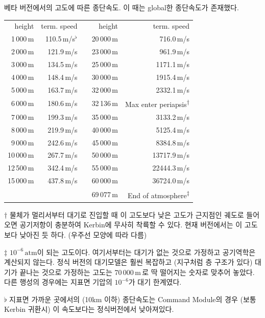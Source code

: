 \documentclass[9pt]{amsbook}
\newcommand{\ttuna}{\textsuperscript{$\dagger$}} %
\newcommand{\ttsecu}{\textsuperscript{$\ddagger$}} %
\begin{document}
\begin{center}
\begin{threeparttable}
	\caption{베타 버전에서의 고도에 따른 종단속도. 이 때는 global한 종단속도가 존재했다.}
		\begin{tabular}{|r|r|r|r|r|}
			\cline{1-2}\cline{4-5}
			height& term. speed&&height& term. speed
			\\\cline{1-2}\cline{4-5}
			1\,000\,m&110.5\,m/s$^\flat$ && 20\,000\,m&716.0\,m/s
			\\\cline{1-2}\cline{4-5}
			2\,000\,m&121.9\,m/s && 23\,000\,{m}&961.9\,m/s
			\\\cline{1-2}\cline{4-5}
			3\,000\,m&134.5\,m/s && 25\,000\,{m}&1171.1\,m/s
			\\\cline{1-2}\cline{4-5}
			4\,000\,m&148.4\,m/s && 30\,000\,{m}&1915.4\,m/s
			\\\cline{1-2}\cline{4-5}
			5\,000\,m&163.7\,m/s && 32\,000\,{m}&2332.1\,m/s
			\\\cline{1-2}\cline{4-5}
			6\,000\,{m}&180.6\,m/s && 32\,136\,{m}&Max enter periapsis\ttuna
			\\\cline{1-2}\cline{4-5}
			7\,000\,{m}&199.3\,m/s && 35\,000\,{m}&3133.2\,m/s
			\\\cline{1-2}\cline{4-5}
			8\,000\,{m}&219.9\,m/s && 40\,000\,{m}&5125.4\,m/s
			\\\cline{1-2}\cline{4-5}
			9\,000\,{m}&242.6\,m/s && 45\,000\,{m}&8384.8\,m/s
			\\\cline{1-2}\cline{4-5}
			10\,000\,{m}&267.7\,m/s && 50\,000\,{m}&13717.9\,m/s
			\\\cline{1-2}\cline{4-5}
			12\,500\,{m}&342.4\,m/s && 55\,000\,{m}&22444.3\,m/s
			\\\cline{1-2}\cline{4-5}
			15\,000\,{m}&437.8\,m/s && 60\,000\,{m}&36724.0\,m/s
			\\\cline{1-2}\cline{4-5}
			\multicolumn{3}{r|}{}&69\,077\,{m}&End of atmosphere\ttsecu
			\\\cline{4-5}
		\end{tabular}
	\begin{tablenotes}
		\item [$\dagger$] 물체가 멀리서부터 대기로 진입할 때 이 고도보다 낮은 고도가 근지점인 궤도로 들어오면
						 공기저항이 충분하여 Kerbin에 무사히 착륙할 수 있다.
						 현재 버전에서는 이 고도보다 낮아진 듯 하다. (우주선 모양에 따라 다름)
		\item[$\ddagger$] $10^{-6}\,\mathrm{atm}$이 되는 고도이다. 여기서부터는 대기가 없는 것으로 가정하고 공기역학은 계산되지 않는다. 정식 버전의 대기모델은 훨씬 복잡하고 (지구처럼 층 구조가 있다) 대기가 끝나는 것으로 가정하는 고도는 70\,000\,m\,로 딱 떨어지는 숫자로 맞추어 놓았다. 다른 행성의 경우에는 지표면 기압의 $10^{-6}$가 대기 한계였다. 
		\item[$\flat$] 지표면 가까운 곳에서의 (10km 이하) 종단속도는 Command Module의 경우 (보통 Kerbin 귀환시) 이 속도보다는 정식버전에서 낮아져있다.
	\end{tablenotes}
\end{threeparttable}
\end{center}
\end{document}
